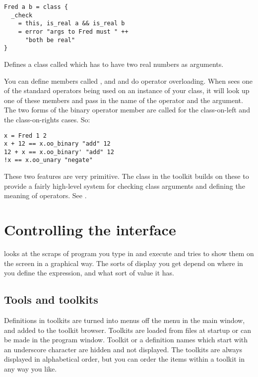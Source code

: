 \begin{verbatim}
Fred a b = class { 
  _check
    = this, is_real a && is_real b
    = error "args to Fred must " ++
      "both be real"
}
\end{verbatim}

\noindent
Defines a class called  which has to have two real numbers as
arguments.

You can define members called ,  and
 and do operator overloading. When \nip{} sees one of the
standard operators being used on an instance of your class, it will look up
one of these members and pass in the name of the operator and the argument.
The two forms of the binary operator member are called for the class-on-left
and the class-on-rights cases. So:

\begin{verbatim}
x = Fred 1 2
x + 12 == x.oo_binary "add" 12
12 + x == x.oo_binary' "add" 12
!x == x.oo_unary "negate" 
\end{verbatim}

These two features are very primitive. The  class in the
 toolkit builds on these to provide a fairly high-level system for
checking class arguments and defining the meaning of operators.
See .

\section{Controlling the interface}

\nip{} looks at the scraps of program you type in and execute and tries to
show them on the screen in a graphical way. The sorts of display you get
depend on where in \nip{} you define the expression, and what sort of value it
has.

\subsection{Tools and toolkits}

Definitions in toolkits are turned into menus off the  menu
in the main window, and added to the toolkit browser. Toolkits are loaded
from files at startup or can be made in the program window.
Toolkit or a definition names which start with
an underscore character are hidden and not displayed. The toolkits are always
displayed in alphabetical order, but you can order the items within a toolkit
in any way you like. 


